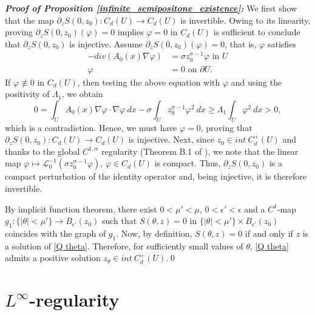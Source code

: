 \documentclass[reqno,oneside]{amsart}
\theoremstyle{definition}
\theoremstyle{remark}
\numberwithin{equation}{section}
\newcommand{\pa}{\partial}
\newcommand{\rar}{\rightarrow}
\newcommand{\na} {\nabla}
\newcommand{\si}{\sigma}
\newcommand{\intcd}{int\ C_d^+ (U)}
\newcommand{\li}{\mathcal{L}_0^{-1}}
\begin{document}
\noindent\textbf{\textit{Proof of Proposition \ref{infinite_semipositone_existence}:}} We first show that the map $\pa_z S(0, z_0): C_d (U) \rar C_d (U)$ is invertible. Owing to its linearity, proving $\pa_z S(0, z_0) (\varphi) =0$ implies $\varphi =0$ in $C_d (U)$ is sufficient to conclude that $\pa_z S(0, z_0)$ is injective. Assume $\pa_z S(0, z_0) (\varphi) =0$, that is, $\varphi$ satisfies
\begin{equation*}
    \begin{aligned}
        -div \left(A_0 (x) \na \varphi \right) &= \si z_0^{\si -1} \varphi \text{ in } U\\
        \varphi &= 0 \text{ on } \pa U.
    \end{aligned}
\end{equation*}
If $\varphi \not\equiv 0$ in $C_d (U)$, then testing the above equation with $\varphi$ and using the positivity of $\Lambda_1$, we obtain
\[0 = \int_{U} A_0 (x) \na \varphi \cdot \na \varphi\ dx - \si \int_{U} z_0^{\si -1} \varphi^2\ dx \geq \Lambda_1 \int_{U} \varphi^2\ dx >0,\]
which is a contradiction. Hence, we must have $\varphi =0$, proving that $\pa_z S(0, z_0): C_d (U) \rar C_d (U)$ is injective. Next, since $z_0 \in \intcd$ and thanks to the global $C^{1,\alpha}$ regularity (Theorem B.1 of \cite{giacomoni2007sobolev}), we note that the linear map $\varphi \mapsto \li \left(\si z_0^{\si -1} \varphi \right)$, $\varphi \in C_d (U)$ is compact. Thus, $\pa_z S(0, z_0)$ is a compact perturbation of the identity operator and, being injective, it is therefore invertible.

By implicit function theorem, there exist $0<\mu' < \mu$, $0<\epsilon' < \epsilon$ and a $C^1$-map $g_1 : \{ |\theta| < \mu'\} \rar B_{\epsilon'} (z_0) $ such that $S(\theta, z) = 0$ in $\{ |\theta| < \mu'\} \times B_{\epsilon'} (z_0)$ coincides with the graph of $g_1$. Now, by definition, $S(\theta, z) = 0$ if and only if $z$ is a solution of \eqref{Q theta}. Therefore, for sufficiently small values of $\theta$, \eqref{Q theta} admits a positive solution $z_{\theta} \in int\ C_d^+ (U)$.\hfill\qed


\section{$L^{\infty}$-regularity}\label{appendix_L_infinity_regularity}
\end{document}
